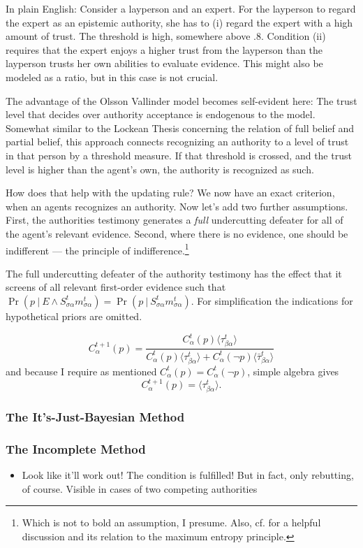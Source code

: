 \documentclass[11pt, a4paper]{scrartcl}
\newcommand{\Stsa}{S^t_{\sigma\alpha}}
\newcommand{\sa}{{\sigma\alpha}}
\newcommand{\given}[1][]{\:#1\vert\:}
\newcommand{\Sm}{\Stsa{}m^t_{\sa}}
\renewcommand{\i}[1]{\emph{#1}}
\renewcommand{\a}{\alpha}
\begin{document}
In plain English: Consider a layperson and an expert. For the layperson to regard the expert as an epistemic authority, she has to (i) regard the expert with a high amount of trust. The threshold is high, somewhere above $.8$. Condition (ii) requires that the expert enjoys a higher trust from the layperson than the layperson trusts her own abilities to evaluate evidence. This might also be modeled as a ratio, but in this case is not crucial.

The advantage of the Olsson Vallinder model becomes self-evident here: The trust level that decides over authority acceptance is endogenous to the model. Somewhat similar to the Lockean Thesis concerning the relation of full belief and partial belief, this approach connects recognizing an authority to a level of trust in that person by a threshold measure. If that threshold is crossed, and the trust level is higher than the agent's own, the authority is recognized as such. 

How does that help with the updating rule? We now have an exact criterion, when an agents recognizes an authority. Now let's add two further assumptions. First, the  authorities testimony generates a \i{full} undercutting defeater for all of the agent's relevant evidence. Second, where there is no evidence, one should be indifferent --- the principle of indifference.\footnote{Which is not to bold an assumption, I presume. Also, cf. \textcite[Ch. 5.3]{Titelbaum2017} for a helpful discussion and its relation to the maximum entropy principle.}   

The full undercutting defeater of the authority testimony has the effect that it screens of all relevant first-order evidence such that $\Pr(p \given E \land \Sm) = \Pr(p \given \Sm)$. For simplification the indications for hypothetical priors are omitted.

\[
    C^{t+1}_\a (p) = \frac{C^t_\a(p) \langle \tau^t_{\beta\a} \rangle}
    {C^t_\a(p) \langle \tau^t_{\beta\a} \rangle + C^t_\a(\neg p) \langle \bar{\tau}^t_{\beta\a} \rangle}
\]
and because I require as mentioned $C^t_\a(p) = C^t_\a( \neg p)$, simple algebra gives 
\[
    C^{t+1}_\a (p) = \langle \tau^t_{\beta\a} \rangle.
\]




\subsubsection{The It's-Just-Bayesian Method}

\subsubsection{The Incomplete Method}

\begin{itemize}
    \item Look like it'll work out! The condition is fulfilled! But in fact, only rebutting, of course. Visible in cases of two competing authorities
\end{itemize}





\printbibliography{}
\end{document}
